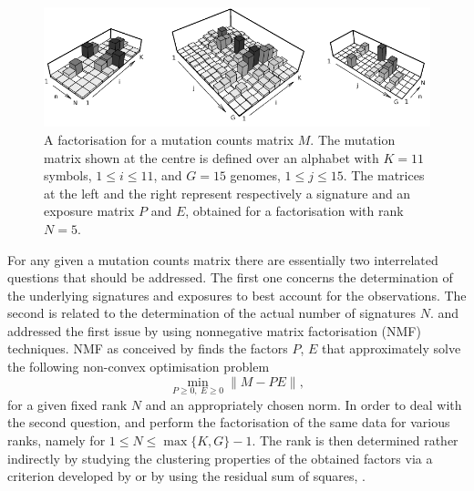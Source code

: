 \documentclass{bioinfo}
\begin{document}
\begin{figure}
  \centering\includegraphics[width=13.5cm]{figs/f_bw_t}
  \caption{\textrm{%
   A factorisation for a mutation counts matrix $M$. The
   mutation matrix shown at the centre is defined over an alphabet
   with $K=11$ symbols, $1 \leq i \leq 11$, and $G=15$
   genomes, $1\leq j\leq 15$. The matrices at the left and
   the right represent respectively a signature and an exposure matrix
   $P$ and $E$, obtained for a factorisation with rank $N=5$. 
   }
  }
 \label{fig:toyNMF}
\end{figure}


For any given a mutation counts matrix there are essentially two
interrelated questions that should be addressed. The first one
concerns the determination of the underlying signatures and exposures
to best account for the observations. The second is related to the
determination of the actual number of signatures $N$. \cite{NCell} and
\cite{A} addressed the first issue by using nonnegative matrix
factorisation (NMF) techniques.  NMF as conceived by \cite{LS} finds
the factors $P$, $E$ that approximately solve the following non-convex
optimisation problem
\begin{equation}
  \label{eqn:NMF}
    \min_{P\geq 0,\ E\geq 0}\|M - PE\|,
\end{equation}
for a given fixed rank $N$ and an appropriately chosen norm.
In order to deal with the second question, \cite{NCell} and \cite{A}
perform the factorisation of the same data for various ranks, namely
for $1 \leq N \leq \max\{K, G\}-1$. The rank is then determined rather 
indirectly by studying the clustering properties of the obtained
factors via a criterion developed by \cite{BTGM} or by using the 
residual sum of squares, \cite{HMSG}.
\end{document}
